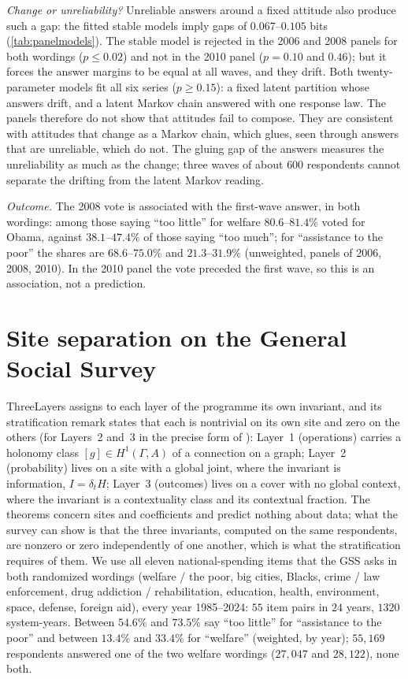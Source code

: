 \documentclass[11pt]{article}
\theoremstyle{definition}
\theoremstyle{remark}
\begin{document}
\emph{Change or unreliability?} Unreliable answers around a fixed attitude also produce such a gap: the fitted stable models imply gaps
of $0.067$--$0.105$ bits (\cref{tab:panelmodels}). The stable model is rejected in the 2006 and 2008 panels for both wordings
($p\le0.02$) and not in the 2010 panel ($p=0.10$ and $0.46$); but it forces the answer margins to be equal at all waves, and they drift.
Both twenty-parameter models fit all six series ($p\ge0.15$): a fixed latent partition whose answers drift, and a latent Markov chain
answered with one response law. The panels therefore do not show that attitudes fail to compose. They are consistent with attitudes that
change as a Markov chain, which glues, seen through answers that are unreliable, which do not. The gluing gap of the answers measures the
unreliability as much as the change; three waves of about $600$ respondents cannot separate the drifting from the latent Markov reading.

\emph{Outcome.} The 2008 vote is associated with the first-wave answer, in both wordings: among those saying ``too little'' for welfare
$80.6$--$81.4\%$ voted for Obama, against $38.1$--$47.4\%$ of those saying ``too much''; for ``assistance to the poor'' the shares are
$68.6$--$75.0\%$ and $21.3$--$31.9\%$ (unweighted, panels of 2006, 2008, 2010). In the 2010 panel the vote preceded the first wave, so
this is an association, not a prediction.

\section{Site separation on the General Social Survey}\label{sec:sites}

ThreeLayers \cite[\S2]{ThreeLayers} assigns to each layer of the programme its own invariant, and its stratification remark states that each is
nontrivial on its own site and zero on the others (for Layers~2 and~3 in the precise form of \cite[Thms.~15.1, 15.3]{ThreeLayers}): Layer~1 (operations) carries a holonomy class $[g]\in H^1(\Gamma,A)$ of a connection on a
graph; Layer~2 (probability) lives on a site with a global joint, where the invariant is information, $I=\delta_tH$; Layer~3 (outcomes)
lives on a cover with no global context, where the invariant is a contextuality class and its contextual fraction. The theorems
concern sites and coefficients and predict nothing about data; what the survey can show is that the three invariants, computed on the
same respondents, are nonzero or zero independently of one another, which is what the stratification requires of them. We use all eleven national-spending items that the GSS asks in both randomized wordings
(welfare / the poor, big cities, Blacks, crime / law enforcement, drug addiction / rehabilitation, education, health, environment, space,
defense, foreign aid), every year 1985--2024: $55$ item pairs in $24$ years, $1320$ system-years. Between $54.6\%$ and $73.5\%$ say
``too little'' for ``assistance to the poor'' and between $13.4\%$ and $33.4\%$ for ``welfare'' (weighted, by year); $55{,}169$
respondents answered one of the two welfare wordings ($27{,}047$ and $28{,}122$), none both.
\end{document}

